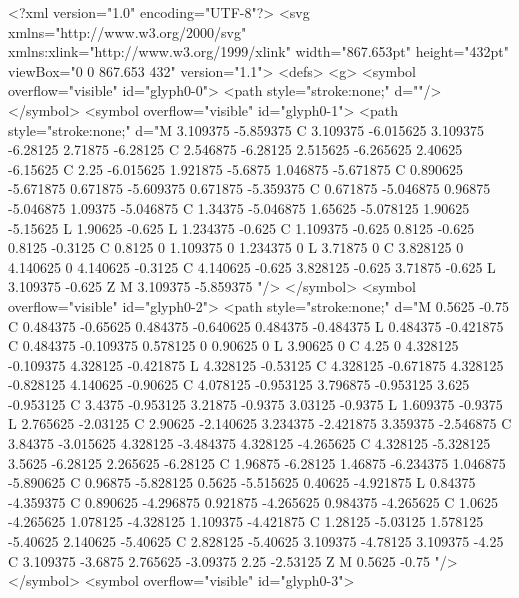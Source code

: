 <?xml version="1.0" encoding="UTF-8"?>
<svg xmlns="http://www.w3.org/2000/svg" xmlns:xlink="http://www.w3.org/1999/xlink" width="867.653pt" height="432pt" viewBox="0 0 867.653 432" version="1.1">
<defs>
<g>
<symbol overflow="visible" id="glyph0-0">
<path style="stroke:none;" d=""/>
</symbol>
<symbol overflow="visible" id="glyph0-1">
<path style="stroke:none;" d="M 3.109375 -5.859375 C 3.109375 -6.015625 3.109375 -6.28125 2.71875 -6.28125 C 2.546875 -6.28125 2.515625 -6.265625 2.40625 -6.15625 C 2.25 -6.015625 1.921875 -5.6875 1.046875 -5.671875 C 0.890625 -5.671875 0.671875 -5.609375 0.671875 -5.359375 C 0.671875 -5.046875 0.96875 -5.046875 1.09375 -5.046875 C 1.34375 -5.046875 1.65625 -5.078125 1.90625 -5.15625 L 1.90625 -0.625 L 1.234375 -0.625 C 1.109375 -0.625 0.8125 -0.625 0.8125 -0.3125 C 0.8125 0 1.109375 0 1.234375 0 L 3.71875 0 C 3.828125 0 4.140625 0 4.140625 -0.3125 C 4.140625 -0.625 3.828125 -0.625 3.71875 -0.625 L 3.109375 -0.625 Z M 3.109375 -5.859375 "/>
</symbol>
<symbol overflow="visible" id="glyph0-2">
<path style="stroke:none;" d="M 0.5625 -0.75 C 0.484375 -0.65625 0.484375 -0.640625 0.484375 -0.484375 L 0.484375 -0.421875 C 0.484375 -0.109375 0.578125 0 0.90625 0 L 3.90625 0 C 4.25 0 4.328125 -0.109375 4.328125 -0.421875 L 4.328125 -0.53125 C 4.328125 -0.671875 4.328125 -0.828125 4.140625 -0.90625 C 4.078125 -0.953125 3.796875 -0.953125 3.625 -0.953125 C 3.4375 -0.953125 3.21875 -0.9375 3.03125 -0.9375 L 1.609375 -0.9375 L 2.765625 -2.03125 C 2.90625 -2.140625 3.234375 -2.421875 3.359375 -2.546875 C 3.84375 -3.015625 4.328125 -3.484375 4.328125 -4.265625 C 4.328125 -5.328125 3.5625 -6.28125 2.265625 -6.28125 C 1.96875 -6.28125 1.46875 -6.234375 1.046875 -5.890625 C 0.96875 -5.828125 0.5625 -5.515625 0.40625 -4.921875 L 0.84375 -4.359375 C 0.890625 -4.296875 0.921875 -4.265625 0.984375 -4.265625 C 1.0625 -4.265625 1.078125 -4.328125 1.109375 -4.421875 C 1.28125 -5.03125 1.578125 -5.40625 2.140625 -5.40625 C 2.828125 -5.40625 3.109375 -4.78125 3.109375 -4.25 C 3.109375 -3.6875 2.765625 -3.09375 2.25 -2.53125 Z M 0.5625 -0.75 "/>
</symbol>
<symbol overflow="visible" id="glyph0-3">
